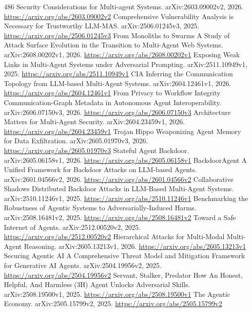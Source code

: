 \documentclass[11pt]{article}
\begin{document}
\begin{thebibliography}{486}
 Security Considerations for Multi-agent Systems. arXiv:2603.09002v2, 2026. \url{https://arxiv.org/abs/2603.09002v2}
 Comprehensive Vulnerability Analysis is Necessary for Trustworthy LLM-MAS. arXiv:2506.01245v3, 2025. \url{https://arxiv.org/abs/2506.01245v3}
 From Monoliths to Swarms A Study of Attack Surface Evolution in the Transition to Multi-Agent Web Systems. arXiv:2608.00202v1, 2026. \url{https://arxiv.org/abs/2608.00202v1}
 Exposing Weak Links in Multi-Agent Systems under Adversarial Prompting. arXiv:2511.10949v1, 2025. \url{https://arxiv.org/abs/2511.10949v1}
 CIA Inferring the Communication Topology from LLM-based Multi-Agent Systems. arXiv:2604.12461v1, 2026. \url{https://arxiv.org/abs/2604.12461v1}
 From Privacy to Workflow Integrity Communication-Graph Metadata in Autonomous Agent Interoperability. arXiv:2606.07150v3, 2026. \url{https://arxiv.org/abs/2606.07150v3}
 Architecture Matters for Multi-Agent Security. arXiv:2604.23459v1, 2026. \url{https://arxiv.org/abs/2604.23459v1}
 Trojan Hippo Weaponizing Agent Memory for Data Exfiltration. arXiv:2605.01970v3, 2026. \url{https://arxiv.org/abs/2605.01970v3}
 Stateful Agent Backdoor. arXiv:2605.06158v1, 2026. \url{https://arxiv.org/abs/2605.06158v1}
 BackdoorAgent A Unified Framework for Backdoor Attacks on LLM-based Agents. arXiv:2601.04566v2, 2026. \url{https://arxiv.org/abs/2601.04566v2}
 Collaborative Shadows Distributed Backdoor Attacks in LLM-Based Multi-Agent Systems. arXiv:2510.11246v1, 2025. \url{https://arxiv.org/abs/2510.11246v1}
 Benchmarking the Robustness of Agentic Systems to Adversarially-Induced Harms. arXiv:2508.16481v2, 2025. \url{https://arxiv.org/abs/2508.16481v2}
 Toward a Safe Internet of Agents. arXiv:2512.00520v2, 2025. \url{https://arxiv.org/abs/2512.00520v2}
 Hierarchical Attacks for Multi-Modal Multi-Agent Reasoning. arXiv:2605.13213v1, 2026. \url{https://arxiv.org/abs/2605.13213v1}
 Securing Agentic AI A Comprehensive Threat Model and Mitigation Framework for Generative AI Agents. arXiv:2504.19956v2, 2025. \url{https://arxiv.org/abs/2504.19956v2}
 Servant, Stalker, Predator How An Honest, Helpful, And Harmless (3H) Agent Unlocks Adversarial Skills. arXiv:2508.19500v1, 2025. \url{https://arxiv.org/abs/2508.19500v1}
 The Agentic Economy. arXiv:2505.15799v2, 2025. \url{https://arxiv.org/abs/2505.15799v2}

\end{thebibliography}
\end{document}
